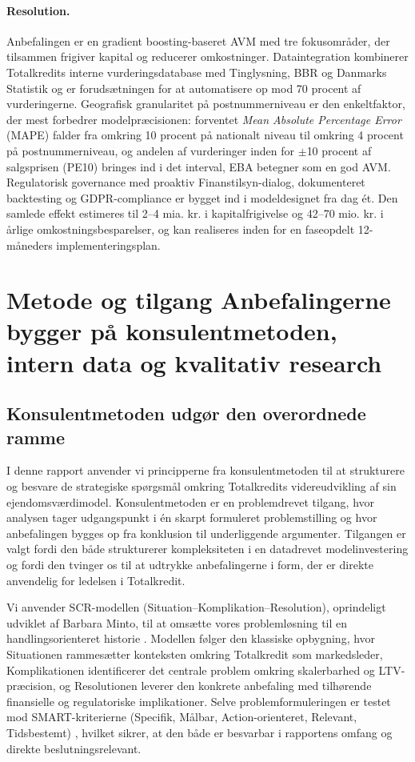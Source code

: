 \documentclass[12pt]{article}
\begin{document}
\paragraph{Resolution.}
Anbefalingen er en gradient boosting-baseret AVM med tre fokusområder, der tilsammen frigiver kapital og reducerer omkostninger. Dataintegration kombinerer Totalkredits interne vurderingsdatabase med Tinglysning, BBR og Danmarks Statistik og er forudsætningen for at automatisere op mod 70 procent af vurderingerne. Geografisk granularitet på postnummerniveau er den enkeltfaktor, der mest forbedrer modelpræcisionen: forventet \textit{Mean Absolute Percentage Error} (MAPE) falder fra omkring 10 procent på nationalt niveau til omkring 4 procent på postnummerniveau, og andelen af vurderinger inden for $\pm$10 procent af salgsprisen (PE10) bringes ind i det interval, EBA betegner som en god AVM. Regulatorisk governance med proaktiv Finanstilsyn-dialog, dokumenteret backtesting og GDPR-compliance er bygget ind i modeldesignet fra dag ét. Den samlede effekt estimeres til 2--4 mia. kr. i kapitalfrigivelse og 42--70 mio. kr. i årlige omkostningsbesparelser, og kan realiseres inden for en faseopdelt 12-måneders implementeringsplan.

\newpage

\section{Metode og tilgang \textbar{} Anbefalingerne bygger på konsulentmetoden, intern data og kvalitativ research}
\label{sec:metode}

\subsection{Konsulentmetoden udgør den overordnede ramme}
\label{sec:metode-konsulent}
I denne rapport anvender vi principperne fra konsulentmetoden til at strukturere og besvare de strategiske spørgsmål omkring Totalkredits videreudvikling af sin ejendomsværdimodel. Konsulentmetoden er en problemdrevet tilgang, hvor analysen tager udgangspunkt i én skarpt formuleret problemstilling og hvor anbefalingen bygges op fra konklusion til underliggende argumenter. Tilgangen er valgt fordi den både strukturerer kompleksiteten i en datadrevet modelinvestering og fordi den tvinger os til at udtrykke anbefalingerne i form, der er direkte anvendelig for ledelsen i Totalkredit.

Vi anvender SCR-modellen (Situation--Komplikation--Resolution), oprindeligt udviklet af Barbara Minto, til at omsætte vores problemløsning til en handlingsorienteret historie \parencite{minto2007}. Modellen følger den klassiske opbygning, hvor Situationen rammesætter konteksten omkring Totalkredit som markedsleder, Komplikationen identificerer det centrale problem omkring skalerbarhed og LTV-præcision, og Resolutionen leverer den konkrete anbefaling med tilhørende finansielle og regulatoriske implikationer. Selve problemformuleringen er testet mod SMART-kriterierne (Specifik, Målbar, Action-orienteret, Relevant, Tidsbestemt) \parencite{mckinsey2007}, hvilket sikrer, at den både er besvarbar i rapportens omfang og direkte beslutningsrelevant.
\end{document}
